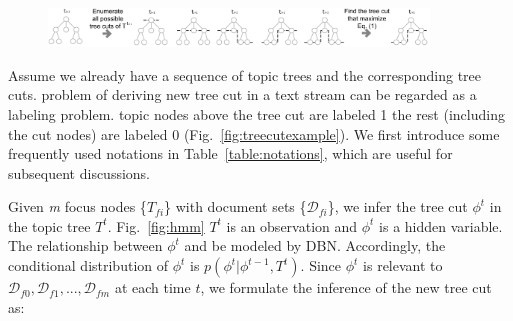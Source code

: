 \begin{figure}[t]
\centering
\includegraphics[width=0.9\textwidth]{fig/treecutalgorithm2}
\caption{}
\vspace{-5mm}
\label{fig:treecutalgorithm}
\end{figure}


Assume  we already have a sequence of topic trees and the corresponding tree cuts.
 problem of deriving  new tree cut in a text stream can  be regarded as a labeling problem.
 topic nodes above the tree cut are labeled 1 the rest (including the cut nodes) are labeled 0 (Fig.~\ref{fig:treecutexample}).
We first introduce some frequently used notations in Table~\ref{table:notations}, which are useful for subsequent discussions.

Given \emph{\normalsize m} focus nodes \{${T_{fi}}$\} with document sets \{$\mathcal{D}_{fi}$\}, we infer the tree cut ${\phi}^t$ in the  topic tree $T^t$.
Fig.~\ref{fig:hmm}  $T^t$ is an observation  and ${\phi}^t$ is a hidden variable.
The relationship between ${\phi}^t$ and  be modeled by DBN.
Accordingly, the conditional distribution of ${\phi}^t$ is $p({\phi}^t|{\phi}^{t-1},T^t)$.
Since ${\phi}^t$ is relevant to $\mathcal{D}_{f0},\mathcal{D}_{f1}, ..., \mathcal{D}_{fm}$ at each time $t$, we formulate the inference of the new tree cut as:

